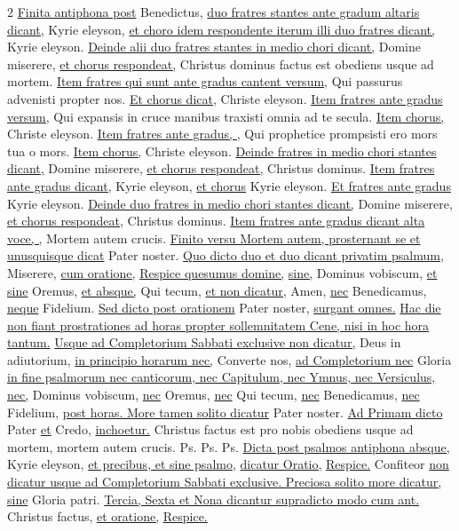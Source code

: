 \begin{multicols*}{2}
\newline \ul{Finita antiphona post} Benedictus, \ul{duo fratres stantes ante gradum altaris dicant,} Kyrie eleyson, \ul{et choro idem respondente iterum illi duo fratres dicant,} Kyrie eleyson. \ul{Deinde alii duo fratres stantes in medio chori dicant,} Domine miserere, \ul{et chorus respondeat,} Christus dominus factus est obediens usque ad mortem. \ul{Item fratres qui sunt ante gradus cantent versum,} Qui passurus advenisti propter nos. \ul{Et chorus dicat,} Christe eleyson. \ul{Item fratres ante gradus versum,} Qui expansis in cruce manibus traxisti omnia ad te secula. \ul{Item chorus,} Christe eleyson. \ul{Item fratres ante gradus, \Vbar ,} Qui prophetice prompsisti ero mors tua o mors. \ul{Item chorus,} Christe eleyson. \ul{Deinde fratres in medio chori stantes dicant,} Domine miserere, \ul{et chorus respondeat,} Christus dominus. \ul{Item fratres ante gradus dicant,} Kyrie eleyson, \ul{et chorus} Kyrie eleyson. \ul{Et fratres ante gradus} Kyrie eleyson. \ul{Deinde duo fratres in medio chori stantes dicant,} Domine miserere, \ul{et chorus respondeat,} Christus dominus. \ul{Item fratres ante gradus dicant alta voce, \Vbar ,} Mortem autem crucis. \ul{Finito versu Mortem autem, prosternant se et unusquisque dicat} Pater noster. \ul{Quo dicto duo et duo dicant privatim psalmum,} Miserere, \ul{cum oratione,} \hyperlink{respice-oratio}{Respice quesumus domine,} \ul{sine,} Dominus vobiscum, \ul{et sine} Oremus, \ul{et absque,} Qui tecum, \ul{et non dicatur,} Amen, \ul{nec} Benedicamus, \ul{neque} Fidelium. \ul{Sed dicto post orationem} Pater noster, \ul{surgant omnes.}
\newline \ul{Hac die non fiant prostrationes ad horas propter sollemnitatem Cene, nisi in hoc hora tantum.}
\newline \ul{Usque ad Completorium Sabbati exclusive non dicatur,} Deus in adiutorium, \ul{in principio horarum nec,} Converte nos, \ul{ad Completorium nec} Gloria \ul{in fine psalmorum nec canticorum, nec Capitulum, nec Ymnus, nec Versiculus, nec,} Dominus vobiscum, \ul{nec} Oremus, \ul{nec} Qui tecum, \ul{nec} Benedicamus, \ul{nec} Fidelium, \ul{post horas. More tamen solito dicatur} Pater noster.
\newline \ul{Ad Primam dicto} Pater \ul{et} Credo, \ul{inchoetur.}
 Christus factus est pro nobis obediens usque ad mortem, mortem autem crucis. {\color{Red} Ps.}  {\color{Red} Ps.}  {\color{Red} Ps.}  \ul{Dicta post psalmos antiphona absque,} Kyrie eleyson, \ul{et precibus, et sine psalmo,}  \ul{dicatur Oratio,} \hyperlink{respice-oratio}{Respice.} Confiteor \ul{non dicatur usque ad Completorium Sabbati exclusive. Preciosa solito more dicatur, sine} Gloria patri. \ul{Tercia, Sexta et Nona dicantur supradicto modo cum ant.} Christus factus, \ul{et oratione,} \hyperlink{respice-oratio}{Respice.}

\end{multicols*}
